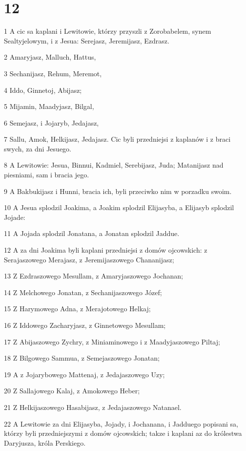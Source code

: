 \chapter{12}

\par 1 A cic sa kaplani i Lewitowie, którzy przyszli z Zorobabelem, synem Sealtyjelowym, i z Jesua: Serejasz, Jeremijasz, Ezdrasz.
\par 2 Amaryjasz, Malluch, Hattus,
\par 3 Sechanijasz, Rehum, Meremot,
\par 4 Iddo, Ginnetoj, Abijasz;
\par 5 Mijamin, Maadyjasz, Bilgal,
\par 6 Semejasz, i Jojaryb, Jedajasz,
\par 7 Sallu, Amok, Helkijasz, Jedajasz. Cic byli przedniejsi z kaplanów i z braci swych, za dni Jesuego.
\par 8 A Lewitowie: Jesua, Binnui, Kadmiel, Serebijasz, Juda; Matanijasz nad piesniami, sam i bracia jego.
\par 9 A Bakbukijasz i Hunni, bracia ich, byli przeciwko nim w porzadku swoim.
\par 10 A Jesua splodzil Joakima, a Joakim splodzil Elijasyba, a Elijasyb splodzil Jojade:
\par 11 A Jojada splodzil Jonatana, a Jonatan splodzil Jaddue.
\par 12 A za dni Joakima byli kaplani przedniejsi z domów ojcowskich: z Serajaszowego Merajasz, z Jeremijaszowego Chananijasz;
\par 13 Z Ezdraszowego Mesullam, z Amaryjaszowego Jochanan;
\par 14 Z Melchowego Jonatan, z Sechanijaszowego Józef;
\par 15 Z Harymowego Adna, z Merajotowego Helkaj;
\par 16 Z Iddowego Zacharyjasz, z Ginnetowego Mesullam;
\par 17 Z Abijaszowego Zychry, z Miniaminowego i z Maadyjaszowego Piltaj;
\par 18 Z Bilgowego Sammua, z Semejaszowego Jonatan;
\par 19 A z Jojarybowego Mattenaj, z Jedajaszowego Uzy;
\par 20 Z Sallajowego Kalaj, z Amokowego Heber;
\par 21 Z Helkijaszowego Hasabijasz, z Jedajaszowego Natanael.
\par 22 A Lewitowie za dni Elijasyba, Jojady, i Jochanana, i Jadduego popisani sa, którzy byli przedniejszymi z domów ojcowskich; takze i kaplani az do królestwa Daryjusza, króla Perskiego.
